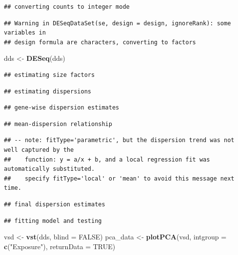 \documentclass[
]{article}
\newenvironment{Shaded}{\begin{snugshade}}{\end{snugshade}}
\newcommand{\AttributeTok}[1]{\textcolor[rgb]{0.13,0.29,0.53}{#1}}
\newcommand{\ConstantTok}[1]{\textcolor[rgb]{0.56,0.35,0.01}{#1}}
\newcommand{\FunctionTok}[1]{\textcolor[rgb]{0.13,0.29,0.53}{\textbf{#1}}}
\newcommand{\NormalTok}[1]{#1}
\newcommand{\OtherTok}[1]{\textcolor[rgb]{0.56,0.35,0.01}{#1}}
\newcommand{\StringTok}[1]{\textcolor[rgb]{0.31,0.60,0.02}{#1}}
\begin{document}
\begin{verbatim}
## converting counts to integer mode
\end{verbatim}

\begin{verbatim}
## Warning in DESeqDataSet(se, design = design, ignoreRank): some variables in
## design formula are characters, converting to factors
\end{verbatim}

\begin{Shaded}
\begin{Highlighting}[]
\NormalTok{dds }\OtherTok{\textless{}{-}} \FunctionTok{DESeq}\NormalTok{(dds)}
\end{Highlighting}
\end{Shaded}

\begin{verbatim}
## estimating size factors
\end{verbatim}

\begin{verbatim}
## estimating dispersions
\end{verbatim}

\begin{verbatim}
## gene-wise dispersion estimates
\end{verbatim}

\begin{verbatim}
## mean-dispersion relationship
\end{verbatim}

\begin{verbatim}
## -- note: fitType='parametric', but the dispersion trend was not well captured by the
##    function: y = a/x + b, and a local regression fit was automatically substituted.
##    specify fitType='local' or 'mean' to avoid this message next time.
\end{verbatim}

\begin{verbatim}
## final dispersion estimates
\end{verbatim}

\begin{verbatim}
## fitting model and testing
\end{verbatim}

\begin{Shaded}
\begin{Highlighting}[]
\NormalTok{vsd }\OtherTok{\textless{}{-}} \FunctionTok{vst}\NormalTok{(dds, }\AttributeTok{blind =} \ConstantTok{FALSE}\NormalTok{)}
\NormalTok{pca\_data }\OtherTok{\textless{}{-}} \FunctionTok{plotPCA}\NormalTok{(vsd, }\AttributeTok{intgroup =} \FunctionTok{c}\NormalTok{(}\StringTok{"Exposure"}\NormalTok{), }\AttributeTok{returnData =} \ConstantTok{TRUE}\NormalTok{)}
\end{Highlighting}
\end{Shaded}
\end{document}
